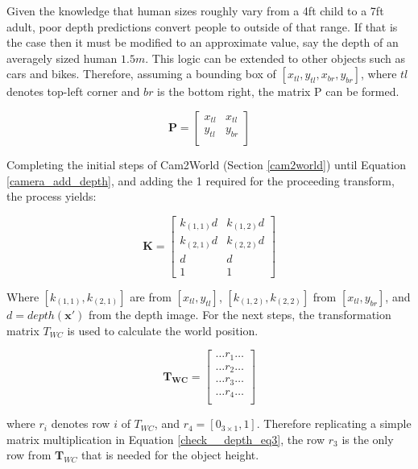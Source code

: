 \documentclass[11pt,twoside]{report}
\begin{document}
Given the knowledge that human sizes roughly vary from a 4ft child to a 7ft adult, poor depth predictions convert people to outside of that range. If that is the case then it must be modified to an approximate value, say the depth of an averagely sized human $1.5m$. This logic can be extended to other objects such as cars and bikes. Therefore, assuming a bounding box of $[x_{tl},y_{tl},x_{br},y_{br}]$, where $tl$ denotes top-left corner and $br$ is the bottom right, the matrix P can be formed.

\begin{equation}
\mathbf{P} = 
\begin{bmatrix}
x_{tl} & x_{tl}\\
y_{tl} & y_{br} \\
\end{bmatrix}
\label{check__depth_eq1}
\end{equation}

Completing the initial steps of Cam2World (Section \ref{cam2world}) until Equation \ref{camera_add_depth}, and adding the 1 required for the proceeding transform, the process yields:

\begin{equation}
\mathbf{K} = 
\begin{bmatrix}
k_{(1,1)}\mathit{d} & k_{(1,2)}\mathit{d}\\
k_{(2,1)}\mathit{d} & k_{(2,2)}\mathit{d}\\
\mathit{d} & \mathit{d}\\
1 & 1
\end{bmatrix}
\label{check__depth_eq2}
\end{equation}

Where $[k_{(1,1)},k_{(2,1)}]$ are from $[x_{tl},y_{tl}]$, $[k_{(1,2)}, k_{(2,2)}]$  from $[x_{tl},y_{br}]$, and $\mathit{d} = depth(\mathbf{x'})$ from the depth image. For the next steps, the transformation matrix $T_{WC}$ is used to calculate the world position.

\begin{equation}
\mathbf{T_{WC}} = 
\begin{bmatrix}
\dots r_{1} \dots \\
\dots r_{2} \dots \\
\dots r_{3} \dots \\
\dots r_{4} \dots \\
\end{bmatrix}
\label{check__depth_eq2}
\end{equation}

where $r_{i}$ denotes row $i$ of $T_{WC}$, and $r_{4} =[0_{3 \times 1},1]$. Therefore replicating a simple matrix multiplication in Equation \ref{check__depth_eq3}, the row $r_{3}$ is the only row from $\mathbf{T}_{WC}$ that is needed for the object height.
\end{document}
